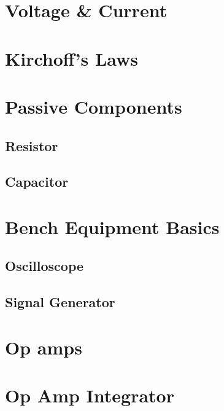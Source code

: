\documentclass{memoir}
\begin{document}
	
	


	\section{Voltage \& Current \label{voltage_current}}
	
	\section{Kirchoff's Laws}
	
	\section{Passive Components}
	\subsection{Resistor}
	\subsection{Capacitor}
	
	\section{Bench Equipment Basics}
	\subsection{Oscilloscope}
	\subsection{Signal Generator}
	
	\section{Op amps}
	
	\section {Op Amp Integrator}
	
\end{document}
